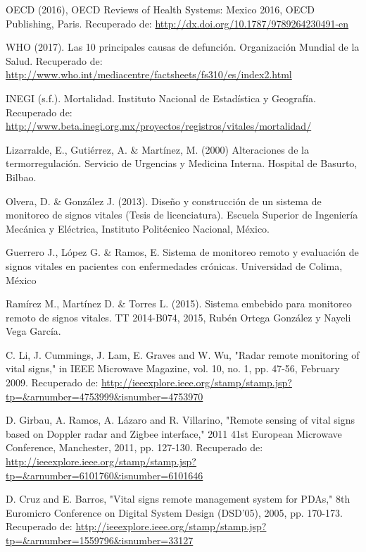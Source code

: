 \begin{thebibliography}{0}
	\setlength{\parsep}{0cm}\setlength{\itemsep}{0cm}\setlength{\topsep}{0cm}
	
	 OECD (2016), OECD Reviews of Health Systems: Mexico 2016, OECD Publishing, Paris. Recuperado de: \url{http://dx.doi.org/10.1787/9789264230491-en}

	 WHO (2017). Las 10 principales causas de defunción. Organización Mundial de la Salud. Recuperado de:  \url{http://www.who.int/mediacentre/factsheets/fs310/es/index2.html}
	
	 INEGI (s.f.). Mortalidad. Instituto Nacional de Estadística y Geografía. Recuperado de: \url{http://www.beta.inegi.org.mx/proyectos/registros/vitales/mortalidad/}
	
	 Lizarralde, E., Gutiérrez, A. \& Martínez, M. (2000) Alteraciones de la termorregulación. Servicio de Urgencias y Medicina Interna. Hospital de Basurto, Bilbao.

	 Olvera, D. \& González J. (2013). Diseño y construcción de un sistema de monitoreo de signos vitales (Tesis de licenciatura). Escuela Superior de Ingeniería Mecánica y Eléctrica, Instituto Politécnico Nacional, México.
	
	 Guerrero J., López G. \& Ramos, E. Sistema de monitoreo remoto y evaluación de signos vitales en pacientes con enfermedades crónicas. Universidad de Colima, México
	
	 Ramírez M., Martínez D. \& Torres L. (2015). Sistema embebido para monitoreo remoto de signos vitales. TT 2014-B074, 2015, Rubén Ortega González y  Nayeli Vega García.
	
	 C. Li, J. Cummings, J. Lam, E. Graves and W. Wu, "Radar remote monitoring of vital signs," in IEEE Microwave Magazine, vol. 10, no. 1, pp. 47-56, February 2009. Recuperado de: \url{http://ieeexplore.ieee.org/stamp/stamp.jsp?tp=\&arnumber=4753999\&isnumber=4753970}
	
	 D. Girbau, A. Ramos, A. Lázaro and R. Villarino, "Remote sensing of vital signs based on Doppler radar and Zigbee interface," 2011 41st European Microwave Conference, Manchester, 2011, pp. 127-130. Recuperado de: \url{http://ieeexplore.ieee.org/stamp/stamp.jsp?tp=\&arnumber=6101760\&isnumber=6101646}
	
	 D. Cruz and E. Barros, "Vital signs remote management system for PDAs," 8th Euromicro Conference on Digital System Design (DSD'05), 2005, pp. 170-173. Recuperado de: \url{http://ieeexplore.ieee.org/stamp/stamp.jsp?tp=\&arnumber=1559796\&isnumber=33127}
	

\end{thebibliography}
